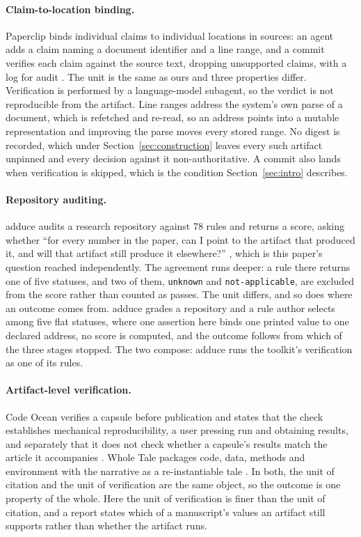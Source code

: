 \documentclass{article}
\newcommand{\code}[1]{\texttt{#1}}
\begin{document}
\paragraph{Claim-to-location binding.} Paperclip binds individual claims to individual locations
in sources: an agent adds a claim naming a document identifier and a line range, and a commit
verifies each claim against the source text, dropping unsupported claims, with a log for audit
\citep{gxl2026paperclip}. The unit is the same as ours and three properties differ. Verification
is performed by a language-model subagent, so the verdict is not reproducible from the artifact.
Line ranges address the system's own parse of a document, which is refetched and re-read, so an
address points into a mutable representation and improving the parse moves every stored range. No
digest is recorded, which under Section~\ref{sec:construction} leaves every such artifact unpinned
and every decision against it non-authoritative. A commit also lands when verification is skipped,
which is the condition Section~\ref{sec:intro} describes.

\paragraph{Repository auditing.} adduce audits a research repository against 78 rules and
returns a score, asking whether ``for every number in the paper, can I point to the artifact that
produced it, and will that artifact still produce it elsewhere?'' \citep{chudasama2026adduce}, which
is this paper's question reached independently. The agreement runs deeper: a rule there returns one
of five statuses, and two of them, \code{unknown} and \code{not-applicable}, are excluded from the
score rather than counted as passes. The unit differs, and so does where an outcome comes from.
adduce grades a repository and a rule author selects among five flat statuses, where one assertion
here binds one printed value to one declared address, no score is computed, and the outcome follows
from which of the three stages stopped. The two compose: adduce runs the toolkit's verification as one of its rules.

\paragraph{Artifact-level verification.} Code Ocean verifies a capsule before publication and
states that the check establishes mechanical reproducibility, a user pressing run and obtaining
results, and separately that it does not check whether a capsule's results match the article it
accompanies \citep{codeocean2026verification}. Whole Tale packages code, data, methods and
environment with the narrative as a re-instantiable tale \citep{brinckman2019wholetale}. In both,
the unit of citation and the unit of verification are the same object, so the outcome is one
property of the whole. Here the unit of verification is finer than the unit of citation, and a
report states which of a manuscript's values an artifact still supports rather than whether the
artifact runs.
\end{document}
